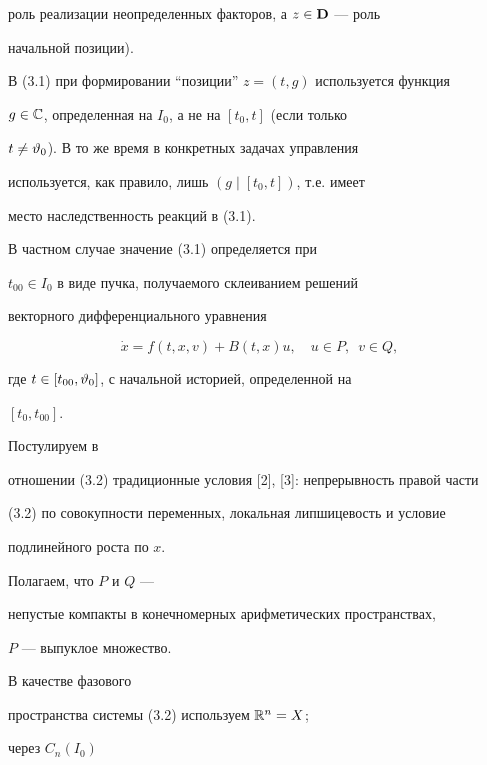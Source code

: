 роль реализации неопределенных факторов, а $z \in {\bold D}$ --- роль


начальной позиции).





\begin{notes}


В (3.1) при формировании ``позиции'' $z = (t,g)$ используется функция


$g \in {\Bbb C}$, определенная на ${I_0}$, а не на $[{t_0},t]$ (если только


$t \ne {{\vartheta}_0}$). В то же время в конкретных задачах управления


используется, как правило, лишь $(g \mid [{t_0},t])$, т.е. имеет


место наследственность реакций в (3.1).


\end{notes}





В частном случае значение (3.1) определяется при


${t_{00}} \in {I_0}$ в виде пучка, получаемого склеиванием решений


векторного дифференциального уравнения


\begin{equation}


\Dot x = f(t,x,v) + {B(t,x)}u,\quad u \in P,\ \;v \in Q,


\end{equation}


где $t \in [{t_{00}},{{\vartheta}_0}]$, с начальной историей, определенной на


$[{t_0},{t_{00}}]$.


Постулируем в


отношении (3.2) традиционные условия [2], [3]: непрерывность правой части


(3.2) по совокупности переменных, локальная липшицевость и условие


подлинейного роста по $x$.


Полагаем, что $P$ и $Q$ ---


непустые компакты в конечномерных арифметических пространствах,


$P$ --- выпуклое множество.


В качестве фазового


пространства системы (3.2) используем ${{\Bbb R}^n} = X$;


через ${C_n}(I_0)$


